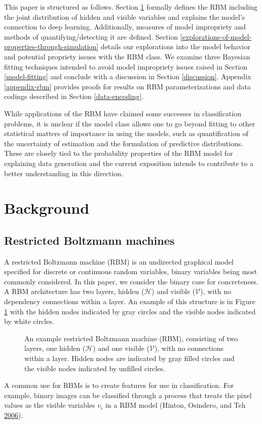 \documentclass[12pt]{article}
\theoremstyle{definition}
\begin{document}
This paper is structured as follows. Section \ref{background} formally
defines the RBM including the joint distribution of hidden and visible
variables and explains the model's connection to deep learning.
Additionally, measures of model impropriety and methods of
quantifying/detecting it are defined. Section
\ref{explorations-of-model-properties-through-simulation} details our
explorations into the model behavior and potential propriety issues with
the RBM class. We examine three Bayesian fitting techniques intended to
avoid model impropriety issues raised in Section \ref{model-fitting} and
conclude with a discussion in Section \ref{discussion}. Appendix
\ref{appendix-rbm} provides proofs for results on RBM parameterizations
and data codings described in Section \ref{data-encoding}.

While applications of the RBM have claimed some successes in
classification problems, it is unclear if the model class allows one to
go beyond fitting to other statistical matters of importance in using
the models, such as quantification of the uncertainty of estimation and
the formulation of predictive distributions. These are closely tied to
the probability properties of the RBM model for explaining data
generation and the current exposition intends to contribute to a better
understanding in this direction.

\section{Background}\label{background}

\subsection{Restricted Boltzmann
machines}\label{restricted-boltzmann-machines}

A restricted Boltzmann machine (RBM) is an undirected graphical model
specified for discrete or continuous random variables, binary variables
being most commonly considered. In this paper, we consider the binary
case for concreteness. A RBM architecture has two layers, hidden
(\(\mathcal{H}\)) and visible (\(\mathcal{V}\)), with no dependency
connections within a layer. An example of this structure is in Figure
\ref{fig:rbm} with the hidden nodes indicated by gray circles and the
visible nodes indicated by white circles.
\begin{figure}
  \centering
  \resizebox{\linewidth}{!}{}
  \caption{An example restricted Boltzmann machine (RBM), consisting of two layers, one hidden ($\mathcal{H}$) and one visible ($\mathcal{V}$), with no connections within a layer. Hidden nodes are indicated by gray filled circles and the visible nodes indicated by unfilled circles.}
  \label{fig:rbm}
\end{figure}
A common use for RBMs is to create features for use in classification.
For example, binary images can be classified through a process that
treats the pixel values as the visible variables \(v_i\) in a RBM model
(Hinton, Osindero, and Teh
\protect\hyperlink{ref-hinton2006fast}{2006}).
\end{document}
